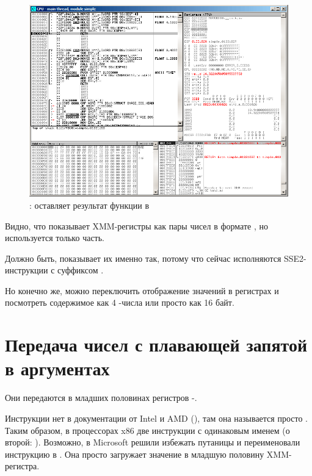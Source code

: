 \clearpage
\begin{figure}[H]
\centering
\includegraphics[scale=\FigScale]{patterns/205_floating_SIMD/simple_olly5.png}
\caption{\olly: \FLD оставляет результат функции в }
\label{fig:FPU_SIMD_simple_olly5}
\end{figure}

Видно, что \olly показывает XMM-регистры как пары чисел в формате \Tdouble,
но используется только  часть.

Должно быть, \olly показывает их именно так, потому что сейчас исполняются SSE2-инструкции
с суффиксом .

Но конечно же, можно переключить отображение значений в регистрах и посмотреть содержимое
как 4 \Tfloat{}-числа или просто как 16 байт.

\clearpage
\section{Передача чисел с плавающей запятой в аргументах}



Они передаются в младших половинах регистров -.



Инструкции  нет в документации от Intel и AMD  (), там она называется просто .
Таким образом, в процессорах x86 две инструкции с одинаковым именем (о второй: ).
Возможно, в Microsoft решили избежать путаницы и переименовали инструкцию в .
Она просто загружает значение в младшую половину XMM-регистра.

